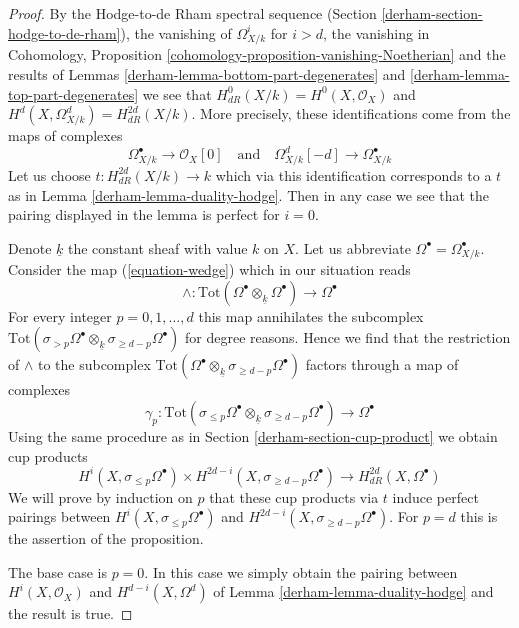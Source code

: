 \begin{proof}

By the Hodge-to-de Rham spectral sequence
(Section \ref{derham-section-hodge-to-de-rham}), the vanishing
of $\Omega^i_{X/k}$ for $i > d$, the vanishing in
Cohomology, Proposition \ref{cohomology-proposition-vanishing-Noetherian}
and the results of Lemmas \ref{derham-lemma-bottom-part-degenerates} and
\ref{derham-lemma-top-part-degenerates}
we see that $H^0_{dR}(X/k) = H^0(X, \mathcal{O}_X)$
and $H^d(X, \Omega^d_{X/k}) = H_{dR}^{2d}(X/k)$.
More precisely, these identifications come from the maps
of complexes
$$
\Omega^\bullet_{X/k} \to \mathcal{O}_X[0]
\quad\text{and}\quad
\Omega^d_{X/k}[-d] \to \Omega^\bullet_{X/k}
$$
Let us choose $t : H_{dR}^{2d}(X/k) \to k$ which via this identification
corresponds to a $t$ as in Lemma \ref{derham-lemma-duality-hodge}.
Then in any case we see that the pairing displayed in the lemma
is perfect for $i = 0$.

\medskip\noindent
Denote $\underline{k}$ the constant sheaf with value $k$ on $X$.
Let us abbreviate $\Omega^\bullet = \Omega^\bullet_{X/k}$.
Consider the map (\ref{equation-wedge}) which in our situation reads
$$
\wedge :
\text{Tot}(\Omega^\bullet \otimes_{\underline{k}} \Omega^\bullet)
\longrightarrow
\Omega^\bullet
$$
For every integer $p = 0, 1, \ldots, d$ this map
annihilates the subcomplex
$\text{Tot}(\sigma_{> p} \Omega^\bullet \otimes_{\underline{k}}
\sigma_{\geq d - p} \Omega^\bullet)$ for degree reasons.
Hence we find that the restriction of $\wedge$ to the subcomplex
$\text{Tot}(\Omega^\bullet \otimes_{\underline{k}}
\sigma_{\geq d - p}\Omega^\bullet)$ factors through a map of complexes
$$
\gamma_p :
\text{Tot}(\sigma_{\leq p} \Omega^\bullet \otimes_{\underline{k}}
\sigma_{\geq d - p} \Omega^\bullet)
\longrightarrow
\Omega^\bullet
$$
Using the same procedure as in Section \ref{derham-section-cup-product} we obtain
cup products
$$
H^i(X, \sigma_{\leq p} \Omega^\bullet) \times
H^{2d - i}(X, \sigma_{\geq d - p}\Omega^\bullet)
\longrightarrow
H_{dR}^{2d}(X, \Omega^\bullet)
$$
We will prove by induction on $p$ that these cup products via $t$
induce perfect pairings between $H^i(X, \sigma_{\leq p} \Omega^\bullet)$
and $H^{2d - i}(X, \sigma_{\geq d - p}\Omega^\bullet)$. For $p = d$
this is the assertion of the proposition.

\medskip\noindent
The base case is $p = 0$. In this case we simply obtain the pairing
between $H^i(X, \mathcal{O}_X)$ and $H^{d - i}(X, \Omega^d)$ of
Lemma \ref{derham-lemma-duality-hodge} and the result is true.


\end{proof}
